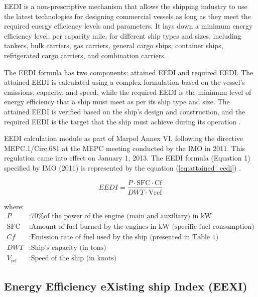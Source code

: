 EEDI is a non-prescriptive mechanism that allows the shipping industry to use the latest technologies for designing commercial vessels as long as they meet the required energy efficiency levels and parameters.
It lays down a minimum energy efficiency level, per capacity mile, for different ship types and sizes, including tankers, bulk carriers, gas carriers, general cargo ships, container ships, refrigerated cargo carriers, and combination carriers.

The EEDI formula has two components: attained EEDI and required EEDI.
The attained EEDI is calculated using a complex formulation based on the vessel's emissions, capacity, and speed,
while the required EEDI is the minimum level of energy efficiency that a ship must meet as per its ship type and size.
The attained EEDI is verified based on the ship's design and construction, and the required EEDI is the target that the ship must achieve during its operation \autocite{ren2019influence}.


EEDI calculation module as part of Marpol Annex VI, following the directive MEPC.1/Circ.681 at the MEPC meeting conducted by the IMO in 2011.
This regulation came into effect on January 1, 2013. The EEDI formula (Equation 1) specified by IMO (2011) is represented by the equation (\ref{eq:attained_eedi}) \autocite{tokucslu2020analyzing}.



\begin{equation}
    EEDI = \frac{{P \cdot \text{SFC} \cdot \text{Cf}}}{{DWT \cdot \text{Vref}}}
    \label{eq:attained_eedi}
\end{equation}


where:
\begin{align*}
    P              & : \text{70\% of the power of the engine (main and auxiliary) in kW}             \\
    \text{SFC}     & : \text{Amount of fuel burned by the engines in kW (specific fuel consumption)} \\
    Cf             & : \text{Emission rate of fuel used by the ship (presented in Table 1)}          \\
    DWT            & : \text{Ship's capacity (in tons)}                                              \\
    V_{\text{ref}} & : \text{Speed of the ship (in knots)}
\end{align*}


\subsection{Energy Efficiency eXisting ship Index  (EEXI)}

